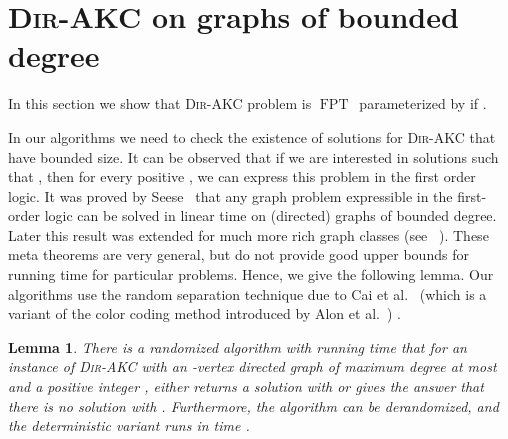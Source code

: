 \documentclass[11pt,a4paper]{article}
\newtheorem{lemma}{Lemma}
\DeclareMathOperator{\operatorClassFPT}{FPT}
\newcommand{\classFPT}{\ensuremath{\operatorClassFPT}}
\newcommand{\DAKC}{\textsc{Dir-AKC}\xspace}
\begin{document}
\section{\DAKC on graphs of bounded degree}
\label{sec:bound-deg} 
In this section we show that \DAKC problem is \classFPT\ parameterized by  if
.

In our algorithms we need to check the existence of solutions for \DAKC that have bounded size. It can be observed that if we
are interested in solutions  such that , then for every positive , we can express this problem
in the first order logic. It was proved by Seese~\cite{Seese96} that any graph problem expressible in the first-order logic
can be solved in linear time on (directed) graphs of bounded degree. Later this result was extended for much more rich graph
classes (see~\cite{DvorakKT10} ). These meta theorems are very general, but do not provide
good upper bounds for running time for particular problems. Hence, we give the following lemma.
Our algorithms use the random separation technique due to Cai et al.~\cite{CaiCC06} (which is a variant of the color coding
method introduced by Alon et al.~\cite{AlonYZ95}) .


\begin{lemma}\label{lem:bounded}
There is a randomized algorithm with running time  that for an instance of \DAKC with an -vertex
directed graph of maximum degree at most  and a positive integer , either returns a solution  with  or gives the answer
that there is no solution with . Furthermore, the algorithm can be derandomized, and the deterministic variant
runs in time  .
\end{lemma}
\end{document}

